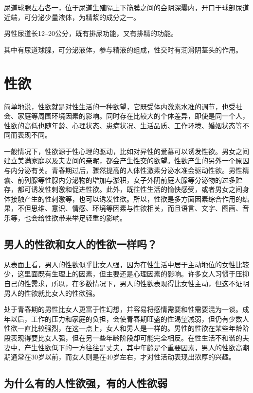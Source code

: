 \documentclass[12pt,UTF8]{ctexbook}
\begin{document}
尿道球腺左右各一，位于尿道生殖隔上下筋膜之间的会阴深囊内，开口于球部尿道近端，可分泌少量液体，为精浆的成分之一。

男性尿道长12--20公分，既有排尿功能，又有排精的功能。

其中有尿道球腺，可分泌液体，参与精液的组成，性交时有润滑阴茎头的作用。

\part{性欲}

简单地说，性欲就是对性生活的一种欲望，它既受体内激素水准的调节，也受社会、家庭等周围环境因素的影响。同时存在比较大的个体差异，即使是同一个人，性欲的高低也随年龄、心理状态、患病状况、生活品质、工作环境、婚姻状态等不同而表现不同。

一般情况下，性欲源于性心理的驱动，比如对异性的爱慕可以诱发性欲。男女之间建立美满家庭以及夫妻间的亲昵，都会产生性交的欲望。性欲产生的另外一个原因与内分泌有关。青春期过后，骤然提高的人体性激素分泌水准会驱动性欲。男性精囊、前列腺等性腺内分泌物的增加与淤积，女子外阴前庭大腺等分泌物的过多贮存，都可诱发性刺激和促进性欲。此外，既往性生活的愉快感受，或者男女之间身体接触产生的性刺激等，也可以诱发性欲。所以，性欲是多方面因素综合作用的结果，不但思维、意识、情感、环境等因素与性欲相关，而且语言、文字、图画、音乐等，也会给性欲带来举足轻重的影响。

\chapter{男人的性欲和女人的性欲一样吗？}

从表面上看，男人的性欲似乎比女人强，因为在性生活中居于主动地位的女性比较少，这里面既有生理上的因素，但主要还是心理因素的影响。许多女人习惯于压抑自己的性需求，所以，在多数情况下，男人的性欲表现得比女性主动，但这不证明男人的性欲就比女人的性欲强。

处于青春期的男性比女人更富于性幻想，并容易将感情需要和性需要混为一谈。成年以后，工作的压力和家庭的负担，会使青春期旺盛的性渴望减弱，但仍有少数人性欲一直比较强烈，在这一点上，女人和男人是一样的。男性的性欲在某些年龄阶段表现得要比女人强，但在另一些年龄阶段却可能完全相反。在性生活不和谐的夫妻中，产生性欲低下的一方往往是丈夫，其中年龄是个重要因素，男人的性欲高潮期通常在30岁以前，而女人则是在40岁左右，才对性活动表现出浓厚的兴趣。

\chapter{为什么有的人性欲强，有的人性欲弱}
\end{document}
